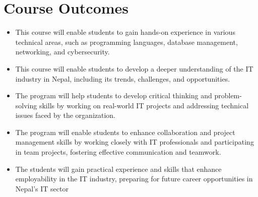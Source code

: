 
\section{Course Outcomes}

\begin{itemize}
\item This course will enable students to gain hands-on experience in various technical areas, such as programming languages, database management, networking, and cybersecurity.
\item This course will enable students to develop a deeper understanding of the IT industry in Nepal, including its trends, challenges, and opportunities.
\item The program will help students to develop critical thinking and problem-solving skills by working on real-world IT projects and addressing technical issues faced by the organization.
\item The program will enable students to enhance collaboration and project management skills by working closely with IT professionals and participating in team projects, fostering effective communication and teamwork.
\item The students will gain practical experience and skills that enhance employability in the IT industry, preparing for future career opportunities in Nepal's IT sector

\end{itemize}
